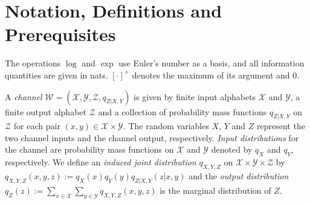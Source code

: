\documentclass[journal]{IEEEtran}
\newcommand{\channelpmf}{q}
\newcommand{\channelInOne}{X}
\newcommand{\channelInOneAlph}{\mathcal{X}}
\newcommand{\channelInOneAlphElement}{x}
\newcommand{\channelInTwo}{Y}
\newcommand{\channelInTwoAlph}{\mathcal{Y}}
\newcommand{\channelInTwoAlphElement}{y}
\newcommand{\channelOut}{Z}
\newcommand{\channelOutAlph}{\mathcal{Z}}
\newcommand{\channelOutAlphElement}{z}
\newcommand{\channel}{\mathcal{W}}
\newcommand{\positive}[1]{\left[ #1 \right]^+}
\begin{document}
\section{Notation, Definitions and Prerequisites}
\label{section:preliminaries}
The operations $\log$ and $\exp$ use Euler's number as a basis, and all information quantities are given in nats. $\positive{\cdot}$ denotes the maximum of its argument and $0$.

A \emph{channel}
$\channel = (\channelInOneAlph, \channelInTwoAlph, \channelOutAlph, \channelpmf_{\channelOut | \channelInOne, \channelInTwo})$
is given by finite input alphabets $\channelInOneAlph$ and $\channelInTwoAlph$, a finite output alphabet $\channelOutAlph$ and a collection of probability mass functions $\channelpmf_{\channelOut | \channelInOne, \channelInTwo}$ on $\channelOutAlph$ for each pair $(\channelInOneAlphElement,\channelInTwoAlphElement) \in \channelInOneAlph \times \channelInTwoAlph$. The random variables $\channelInOne$, $\channelInTwo$ and $\channelOut$ represent the two channel inputs and the channel output, respectively. \emph{Input distributions} for the channel are probability mass functions on $\channelInOneAlph$ and $\channelInTwoAlph$ denoted by $\channelpmf_{\channelInOne}$ and $\channelpmf_{\channelInTwo}$, respectively. We define an \emph{induced joint distribution} $\channelpmf_{\channelInOne, \channelInTwo, \channelOut}$ on $\channelInOneAlph \times \channelInTwoAlph \times \channelOutAlph$ by
$\channelpmf_{\channelInOne, \channelInTwo, \channelOut}(\channelInOneAlphElement,\channelInTwoAlphElement,\channelOutAlphElement) :=  \channelpmf_{\channelInOne}(\channelInOneAlphElement) \channelpmf_{\channelInTwo}(\channelInTwoAlphElement) \channelpmf_{\channelOut | \channelInOne, \channelInTwo}(\channelOutAlphElement | \channelInOneAlphElement,\channelInTwoAlphElement)$
and the \emph{output distribution}
$
\channelpmf_\channelOut(\channelOutAlphElement)
:=
\sum_{\channelInOneAlphElement \in \channelInOneAlph}
\sum_{\channelInTwoAlphElement \in \channelInTwoAlph}
  \channelpmf_{\channelInOne, \channelInTwo, \channelOut}(\channelInOneAlphElement, \channelInTwoAlphElement, \channelOutAlphElement)
$
is the marginal distribution of $\channelOut$.
\end{document}

